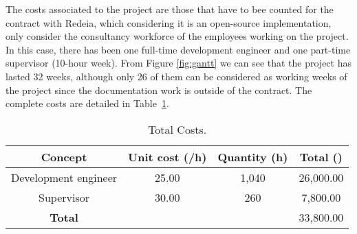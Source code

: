 
The costs associated to the project are those that have to bee counted for the contract with Redeia, which considering it is an open-source implementation, only consider the consultancy workforce of the employees working on the project. In 
this case, there has been one full-time development engineer and one part-time supervisor (10-hour week). 
From Figure \ref{fig:gantt} we can see that the project has lasted 32 weeks, although only 26 of them can be considered as working weeks of the project since the documentation
work is outside of the contract.
The complete costs are detailed in Table~\ref{tab:equip}.

\begin{table}[!htb]\centering
	\caption{Total Costs.}
	\begin{tabular}{ccc|c}
		\hline
		\textbf{Concept} & \textbf{Unit cost (\texteuro/h)} & \textbf{Quantity (h)} & \textbf{Total (\texteuro)} \\
		\hline
		\hline
		Development engineer & 25.00 & 1,040 & 26,000.00 \\ 
		Supervisor & 30.00 & 260 & 7,800.00 \\
		\hline
		\textbf{Total} & & & 33,800.00 \\
		\hline
	\end{tabular}
	\label{tab:equip}
\end{table}


